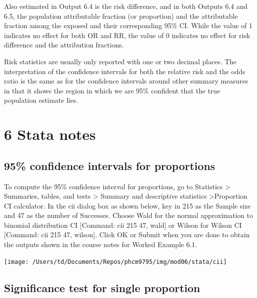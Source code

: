\documentclass[
]{memoir}
\begin{document}
Also estimated in Output 6.4 is the risk difference, and in both Outputs 6.4 and 6.5, the population attributable fraction (or proportion) and the attributable fraction among the exposed and their corresponding 95\% CI. While the value of 1 indicates no effect for both OR and RR, the value of 0 indicates no effect for risk difference and the attribution fractions.

Risk statistics are usually only reported with one or two decimal places. The interpretation of the confidence intervals for both the relative risk and the odds ratio is the same as for the confidence intervals around other summary measures in that it shows the region in which we are 95\% confident that the true population estimate lies.

\hypertarget{stata-notes-4}{%
\chapter*{\texorpdfstring{\textbf{6} Stata notes}{6 Stata notes}}\label{stata-notes-4}}

\hypertarget{confidence-intervals-for-proportions}{%
\section{95\% confidence intervals for proportions}\label{confidence-intervals-for-proportions}}

To compute the 95\% confidence interval for proportions, go to Statistics \textgreater{} Summaries, tables, and tests \textgreater{} Summary and descriptive statistics \textgreater Proportion CI calculator. In the cii dialog box as shown below, key in 215 as the Sample size and 47 as the number of Successes. Choose Wald for the normal approximation to binomial distribution CI {[}Command: cii 215 47, wald{]} or Wilson for Wilson CI {[}Command: cii 215 47, wilson{]}. Click OK or Submit when you are done to obtain the outputs shown in the course notes for Worked Example 6.1.

\texttt{[image: /Users/td/Documents/Repos/phcm9795/img/mod06/stata/cii]}

\hypertarget{significance-test-for-single-proportion}{%
\section{Significance test for single proportion}\label{significance-test-for-single-proportion}}
\end{document}
